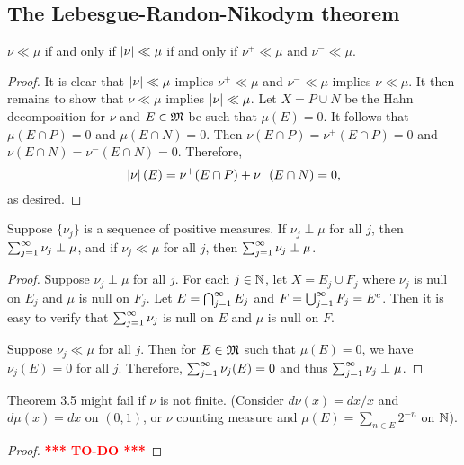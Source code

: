 \documentclass[a4paper]{article}
\newcommand{\TODO}{\textcolor{red}{\textbf{*** TO-DO ***}}}
\begin{document}
\subsection{The Lebesgue-Randon-Nikodym theorem}

\begin{ex}[Folland 3.8]
$\nu \ll \mu$ if and only if $\left\lvert \nu\right\rvert \ll \mu$ 
if and only if $\nu^+ \ll \mu$ and $\nu^- \ll \mu$.
\end{ex}

\begin{proof}
It is clear that $\left\lvert \nu\right\rvert \ll \mu$ implies 
$\nu^+ \ll \mu$ and $\nu^- \ll \mu$ implies 
$\nu \ll \mu$. It then remains to show that $\nu \ll \mu$ 
implies $\left\lvert \nu\right\rvert \ll \mu$. Let $X = P \cup N$ be the Hahn 
decomposition for $\nu$ and $E \in \mathfrak{M}$ be such that 
$\mu(E) = 0$. It follows that 
$\mu(E \cap P) = 0$ and $\mu (E \cap N) = 0$. Then 
$\nu(E \cap P) = \nu^+ (E \cap P) = 0$ and 
$\nu(E \cap N) = \nu^- (E \cap N) = 0$. Therefore, 
\[
\left\lvert \nu\right\rvert (E) = \nu^+ (E \cap P) + \nu^- (E \cap N) = 0,
\]
as desired.
\end{proof}

\begin{ex}[Folland 3.9]
Suppose $\{\nu_j\}$ is a sequence of positive measures.
If $\nu_j \perp \mu$ for all $j$, then $\sum_{j=1}^\infty \nu_j \perp \mu$, 
and if $\nu_j \ll \mu$ for all $j$, then $\sum_{j=1}^\infty \nu_j 
\perp \mu$.
\end{ex}

\begin{proof}
Suppose $\nu_j \perp \mu$ for all $j$. 
For each $j \in \mathbb{N}$, let $X = E_j \cup F_j$ where $\nu_j$
is null on $E_j$ and $\mu$ is null on $F_j$. Let 
$E = \bigcap_{j=1}^\infty E_j$ and $F = \bigcup_{j=1}^\infty F_j = E^c$. Then it is 
easy to verify that $\sum_{j=1}^\infty \nu_j$ is null on $E$ and 
$\mu$ is null on $F$.

Suppose $\nu_j \ll \mu$ for all $j$. Then for $E \in \mathfrak{M}$ such that 
$\mu(E) = 0$, we have $\nu_j (E) = 0$ for all $j$. Therefore,
$\sum_{j=1}^\infty \nu_j (E) = 0$ and thus $\sum_{j=1}^\infty \nu_j \perp \mu$.
\end{proof}

\begin{ex}[Follan 3.10]
Theorem 3.5 might fail if $\nu$ is not finite. (Consider $d \nu (x) = dx / x 
$ and $d \mu(x) = dx$ on $(0, 1)$, or $\nu$ counting measure and $\mu(E) 
= \sum_{n \in E} 2^{-n}$ on $\mathbb{N}$).
\end{ex}

\begin{proof}
\TODO
\end{proof}
\end{document}

